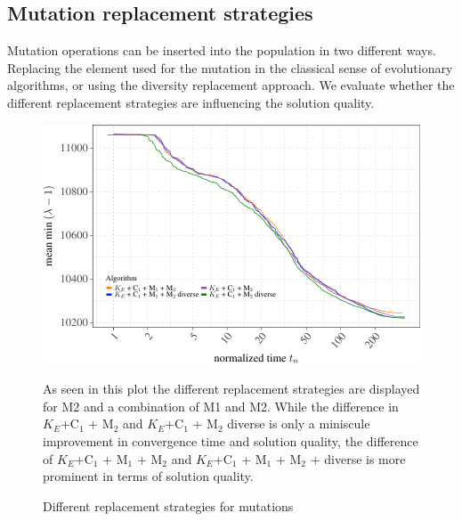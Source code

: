 \documentclass[a4paper,12pt,titlepage, BCOR7mm,headsepline]{scrbook}
\numberwithin{equation}{section}
\begin{document}

\subsection{Mutation replacement strategies}


Mutation operations can be inserted into the population in two different ways. Replacing the element used for the mutation in the classical sense of evolutionary algorithms, or using the diversity replacement approach. We evaluate whether the different replacement strategies are influencing the solution quality.
\begin{figure}[H]
\caption{Different replacement strategies for mutations}
\begin{center}
\includegraphics{rnw/tuning_subset_plots/diverse_plot-1}

\end{center}
As seen in this plot the different replacement strategies are displayed for M2 and a combination of M1 and M2. While the difference in $K_E$+C$_1$ + M$_2$ and $K_E$+C$_1$ + M$_2$ diverse is only a miniscule improvement in convergence time and solution quality, the difference of $K_E$+C$_1$ + M$_1$ + M$_2$ and $K_E$+C$_1$ + M$_1$ + M$_2$ + diverse is more prominent in terms of solution quality.

\end{figure}
\end{document}
